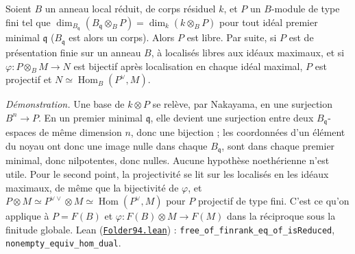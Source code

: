 \begin{encadre}
\begin{theoreme*}
Soient $B$ un anneau local réduit, de corps résiduel $k$, et $P$ un $B$-module de type fini tel que $\dim_{B_{\mathfrak q}} (B_{\mathfrak q} \otimes_B P) = \dim_k (k \otimes_B P)$ pour tout idéal premier minimal $\mathfrak q$ ($B_{\mathfrak q}$ est alors un corps). Alors $P$ est libre. Par suite, si $P$ est de présentation finie sur un anneau $B$, à localisés libres aux idéaux maximaux, et si $\varphi \colon P \otimes_B M \to N$ est bijectif après localisation en chaque idéal maximal, $P$ est projectif et $N \simeq \operatorname{Hom}_B(P^\vee, M)$.
\end{theoreme*}
\end{encadre}
{\small \emph{Démonstration.} Une base de $k \otimes P$ se relève, par Nakayama, en une surjection $B^n \to P$. En un premier minimal $\mathfrak q$, elle devient une surjection entre deux $B_{\mathfrak q}$-espaces de même dimension $n$, donc une bijection ; les coordonnées d'un élément du noyau ont donc une image nulle dans chaque $B_{\mathfrak q}$, sont dans chaque premier minimal, donc nilpotentes, donc nulles. Aucune hypothèse noethérienne n'est utile. Pour le second point, la projectivité se lit sur les localisés en les idéaux maximaux, de même que la bijectivité de $\varphi$, et $P \otimes M \simeq P^{\vee\vee} \otimes M \simeq \operatorname{Hom}(P^\vee, M)$ pour $P$ projectif de type fini. C'est ce qu'on applique à $P = F(B)$ et $\varphi \colon F(B) \otimes M \to F(M)$ dans la réciproque sous la finitude globale. Lean (\href{\leanblob/RingTheory/Folder94.lean}{\texttt{Folder94.\allowbreak{}lean}}) : \texttt{free\_of\_finrank\_eq\_of\_isReduced}, \texttt{nonempty\_equiv\_hom\_dual}.\par}
